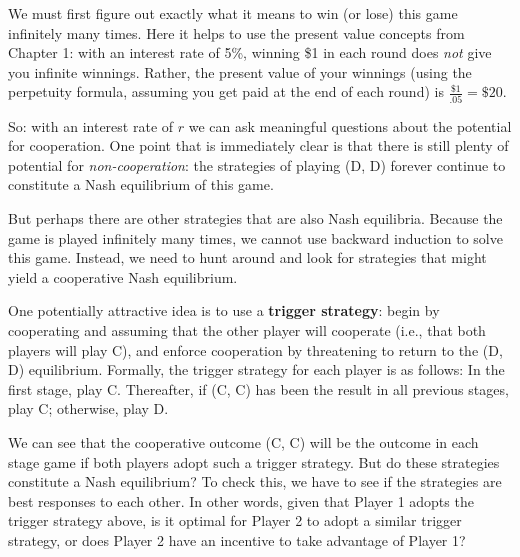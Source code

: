 
We must first figure out exactly what it means to win (or lose) this game infinitely many times. Here it helps to use the present value concepts from Chapter 1: with an interest rate of 5\%, winning \$1 in each round does \textit{not} give you infinite winnings. Rather, the present value of your winnings (using the perpetuity formula, assuming you get paid at the end of each round) is $\displaystyle\frac{\$1}{.05}=\$20$.

So: with an interest rate of $r$ we can ask meaningful questions about the potential for cooperation. One point that is immediately clear is that there is still plenty of potential for \emph{non-cooperation}: the strategies of playing (D, D) forever continue to constitute a Nash equilibrium of this game.

But perhaps there are other strategies that are also Nash equilibria. Because the game is played infinitely many times, we cannot use backward induction to solve this game. Instead, we need to hunt around and look for strategies that might yield a cooperative Nash equilibrium.

One potentially attractive idea is to use a \textbf{trigger strategy}: begin by cooperating and assuming that the other player will cooperate (i.e., that both players will play C), and enforce cooperation by threatening to return to the (D, D) equilibrium. Formally, the trigger strategy for each player is as follows: In the first stage, play C. Thereafter, if (C, C) has been the result in all previous stages, play C; otherwise, play D.

We can see that the cooperative outcome (C, C) will be the outcome in each stage game if both players adopt such a trigger strategy. But do these strategies constitute a Nash equilibrium? To check this, we have to see if the strategies are best responses to each other. In other words,  given that Player 1 adopts the trigger strategy above, is it optimal for Player 2 to adopt a similar trigger strategy, or does Player 2 have an incentive to take advantage of Player 1? %

